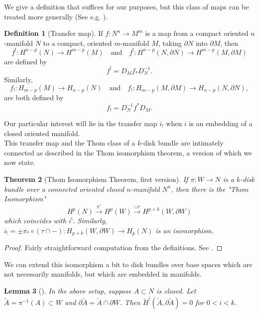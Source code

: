 \documentclass[reqno]{amsart}
\newtheorem{theorem}{Theorem}[section]
\newtheorem{lemma}[theorem]{Lemma}
\theoremstyle{definition}
\newtheorem{definition}[theorem]{Definition}
\theoremstyle{remark}
\begin{document}
We give a definition that suffices for our purposes, but
this class of maps can be treated more generally (See e.g. \cite{Dold}).

\begin{definition}[Transfer map]
    If $f \colon N^{n} \to M^{m}$ is a map from a 
    compact oriented $n$-manifold $N$ to a compact, oriented
    $m$-manifold $M$, taking 
    $\partial N$ into $\partial M$, then
    \[
    f^{!} \colon H^{n-p} (N) \to H^{m-p}(M) \quad
    \text{and} \quad 
    f^{!} \colon H^{n-p}(N, \partial N) \to H^{m-p}(M, \partial M)
    \] 
    are defined by
    \[
    f^{!} = D_M f_* D_N^{-1}.
    \] 
    Similarly,
    \[
    f_! \colon H_{m-p}(M) \to H_{n-p}(N) \quad
    \text{and} \quad
    f_{!} \colon H_{m-p}(M, \partial M) \to 
    H_{n-p}(N, \partial N),
    \] 
    are both defined by
    \[
    f_! = D_N^{-1} f^{*} D_M.
    \] 
\end{definition}

Our particular interest will lie in 
the transfer map $i_!$ when $i$ is an embedding
of a closed oriented manifold.\\
\linebreak
This transfer map and the Thom class of a $k$-disk bundle are
intimately connected as described in the Thom isomorphism theorem, a
version of which we now state.

\begin{theorem}[Thom Isomorphism Theorem, first version]
    If $\pi \colon W \to N$ is a $k$-disk bundle
    over a connected oriented closed $n$-manifold $N^{n}$, then
    there is the "Thom Isomorphism"
    \[
    H^{p}(N) \stackrel{\pi^{*}}{\to} H^{p}(W)
    \stackrel{\cup \tau}{\to} H^{p+k}(W, \partial W)
    \] 
    which coincides with $i^{!}$. Similarly,
    $i_! = \pm \pi_* \circ \left( \tau \cap - \right) \colon
    H_{p+k}\left( W, \partial W \right) \to 
    H_p (N)$ is an isomorphism.
\end{theorem}

\begin{proof}
    Fairly straightforward computation from the definitions. 
    See \cite{Bredon}.
\end{proof}

We can extend this isomorphism a bit to
disk bundles over base spaces which are not necessarily manifolds,
but which are embedded in manifolds.






\begin{lemma}[]
    In the above setup, suppose
    $A \subset N$ is closed. Let
    $\tilde{A} = \pi^{-1}(A) \subset W$ and
    $\partial \tilde{A} = \tilde{A} \cap \partial W$.
    Then
    $\check{H}^{i}\left( \tilde{A},
    \partial \tilde{A} \right) = 0$ for 
    $0<i < k$.
\end{lemma}
\end{document}
